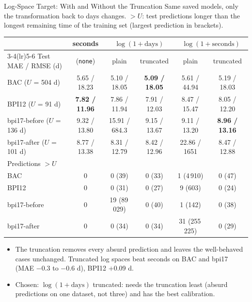 \documentclass[aspectratio=169]{beamer} %
\begin{document}
\begin{frame}{Log-Space Target: With and Without the Truncation}
  \scriptsize
  Same saved models, only the transformation back to days changes. $>U$: test predictions longer than the
  longest remaining time of the training set (largest prediction in brackets).
  \begin{center}\tiny\setlength{\tabcolsep}{3.5pt}\setlength{\aboverulesep}{0pt}\setlength{\belowrulesep}{1pt}
  \begin{tabular}{lccccc}
    \toprule
     & seconds & \multicolumn{2}{c}{$\log(1+\text{days})$} & \multicolumn{2}{c}{$\log(1+\text{seconds})$} \\
    \cmidrule(lr){3-4}\cmidrule(lr){5-6}
    Test MAE / RMSE (d) & (\texttt{none}) & plain & \alert{truncated} & plain & \alert{truncated} \\
    \midrule
    BAC ($U$ = 504 d)          & 5.65 / 18.23 & 5.10 / 18.05    & \textbf{5.09 / 18.05} & 5.61 / 44.94  & 5.19 / 18.03 \\
    BPI12 ($U$ = 91 d)         & \textbf{7.82 / 11.96} & 7.86 / 11.94 & 7.91 / 12.03 & 8.47 / 15.47 & 8.05 / 12.20 \\
    bpi17-before ($U$ = 136 d) & 9.32 / 13.80 & 15.91 / 684.3   & 9.15 / 13.67          & 9.11 / 13.20  & \textbf{8.96 / 13.16} \\
    bpi17-after ($U$ = 101 d)  & 8.77 / 13.38 & 8.31 / 12.79    & 8.42 / 12.96          & 22.86 / 1651  & 8.47 / 12.88 \\
    \midrule
    Predictions $> U$ & & & & & \\
    \midrule
    BAC          & 0 & 0 (39)     & 0 (33) & 1 (4\,910)     & 0 (47) \\
    BPI12        & 0 & 0 (31)     & 0 (27) & 9 (603)        & 0 (24) \\
    bpi17-before & 0 & 19 (89\,029) & 0 (40) & 1 (142)      & 0 (38) \\
    bpi17-after  & 0 & 0 (34)     & 0 (34) & 31 (255\,225)  & 0 (29) \\
    \bottomrule
  \end{tabular}
  \end{center}
  \vspace{-0.2cm}
  \begin{itemize}
    \item The truncation removes every absurd prediction and leaves the well-behaved cases unchanged.
      Truncated log spaces beat seconds on BAC and bpi17 (MAE $-$0.3 to $-$0.6 d), BPI12 $+$0.09 d.
    \item Chosen: \alert{$\log(1+\text{days})$ truncated}: needs the truncation least (absurd predictions on one
      dataset, not three) and has the best calibration.
  \end{itemize}
\end{frame}
\end{document}
